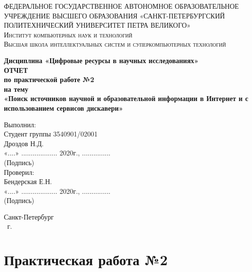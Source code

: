 \documentclass[14pt,a4paper,report]{report}
\begin{document}
\def\contentsname{Содержание}

\begin{titlepage}
	\begin{center}
		\textsc{ФЕДЕРАЛЬНОЕ ГОСУДАРСТВЕННОЕ АВТОНОМНОЕ ОБРАЗОВАТЕЛЬНОЕ УЧРЕЖДЕНИЕ ВЫСШЕГО ОБРАЗОВАНИЯ
«САНКТ-ПЕТЕРБУРГСКИЙ ПОЛИТЕХНИЧЕСКИЙ УНИВЕРСИТЕТ ПЕТРА ВЕЛИКОГО»\\[5mm]
			Институт компьютерных наук и технологий\\
			Высшая школа интеллектуальных систем и суперкомпьютерных технологий}
		
		\vfill
		
		\textbf{Дисциплина «Цифровые ресурсы в научных исследованиях»\\[10mm]
		ОТЧЕТ\\[2mm]
		по практической работе №2\\[2mm]
		на тему\\[2mm]
			«Поиск источников научной и образовательной информации в Интернет и с использованием сервисов дискавери»\\[41mm]
		}
	\end{center}
	
	\hfill
	\begin{minipage}{.4\textwidth}
		Выполнил:\\[2mm] 
        Студент группы 3540901/02001\\
		Дроздов Н.Д.\\[2mm]
        «....» ................... 2020г., ...............\\
        \hspace*{38mm} (Подпись)\\[2mm]
		Проверил:\\[2mm] 
		Бендерская Е.Н.\\[2mm]
		«....» ................... 2020г., ...............\\
        \hspace*{38mm} (Подпись)\\
	\end{minipage}
	\vfill
	\begin{center}
		Санкт-Петербург\\ \the\year\ г.
	\end{center}
\end{titlepage}

\tableofcontents
\clearpage

\chapter{Практическая работа №2}
\end{document}
